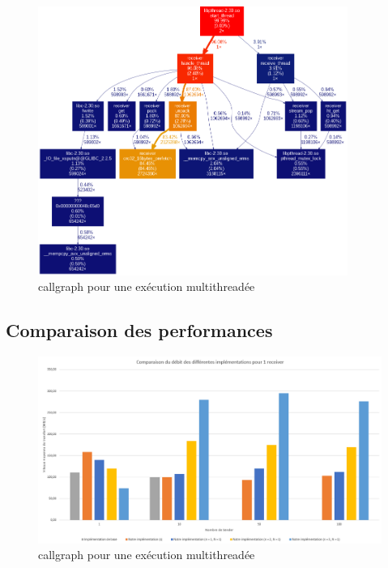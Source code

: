 \documentclass[../main.tex]{subfiles}
\begin{document}
\begin{figure}
    \includegraphics[width=0.9\textwidth]{assets/callgraph.png}
    \caption{callgraph pour une exécution multithreadée}
    \label{sec:graph_mult}
\end{figure}

\newpage

\subsection{Comparaison des performances}

\newpage
\begin{figure}
    \includegraphics[scale=1.2]{assets/test_1.PNG}
    \caption{callgraph pour une exécution multithreadée}
    \label{sec:plot_1_recv}
\end{figure}
\end{document}
